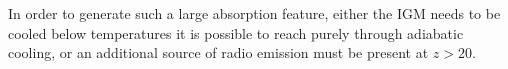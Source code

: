 \begin{bibunit}
In order to generate such a large
absorption feature, either the IGM needs to be cooled below temperatures it is possible to reach
purely through adiabatic cooling, or an additional source of radio emission must be present at $z >
20$.

















\end{bibunit}

